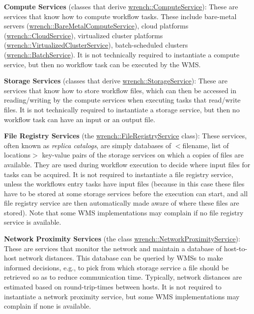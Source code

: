 \begin{DoxyItemize}
\item {\bfseries Compute Services} (classes that derive {\ttfamily \hyperlink{classwrench_1_1_compute_service}{wrench\+::\+Compute\+Service}})\+: These are services that know how to compute workflow tasks. These include bare-\/metal servers ({\ttfamily \hyperlink{classwrench_1_1_bare_metal_compute_service}{wrench\+::\+Bare\+Metal\+Compute\+Service}}), cloud platforms ({\ttfamily \hyperlink{classwrench_1_1_cloud_service}{wrench\+::\+Cloud\+Service}}), virtualized cluster platforms ({\ttfamily \hyperlink{classwrench_1_1_virtualized_cluster_service}{wrench\+::\+Virtualized\+Cluster\+Service}}), batch-\/scheduled clusters ({\ttfamily \hyperlink{classwrench_1_1_batch_service}{wrench\+::\+Batch\+Service}}). It is not technically required to instantiate a compute service, but then no workflow task can be executed by the W\+MS.
\item {\bfseries Storage Services} (classes that derive {\ttfamily \hyperlink{classwrench_1_1_storage_service}{wrench\+::\+Storage\+Service}})\+: These are services that know how to store workflow files, which can then be accessed in reading/writing by the compute services when executing tasks that read/write files. It is not technically required to instantiate a storage service, but then no workflow task can have an input or an output file.
\item {\bfseries File Registry Services} (the {\ttfamily \hyperlink{classwrench_1_1_file_registry_service}{wrench\+::\+File\+Registry\+Service}} class)\+: These services, often known as {\itshape replica catalogs}, are simply databases of $<$filename, list of locations$>$ key-\/value pairs of the storage services on which a copies of files are available. They are used during workflow execution to decide where input files for tasks can be acquired. It is not required to instantiate a file registry service, unless the workflow\textquotesingle{}s entry tasks have input files (because in this case these files have to be stored at some storage services before the execution can start, and all file registry service are then automatically made aware of where these files are stored). Note that some W\+MS implementations may complain if no file registry service is available.
\item {\bfseries Network Proximity Services} (the class {\ttfamily \hyperlink{classwrench_1_1_network_proximity_service}{wrench\+::\+Network\+Proximity\+Service}})\+: These are services that monitor the network and maintain a database of host-\/to-\/host network distances. This database can be queried by W\+M\+Ss to make informed decisions, e.\+g., to pick from which storage service a file should be retrieved so as to reduce communication time. Typically, network distances are estimated based on round-\/trip-\/times between hosts. It is not required to instantiate a network proximity service, but some W\+MS implementations may complain if none is available.

\end{DoxyItemize}
